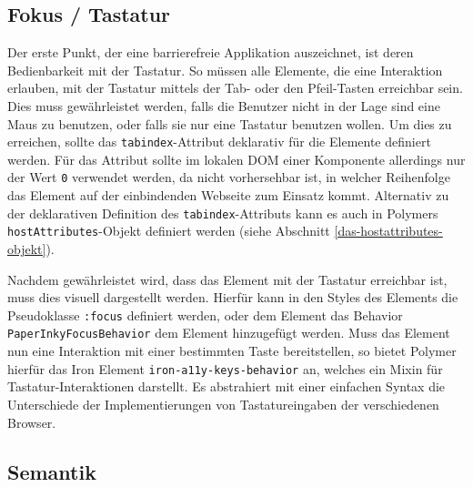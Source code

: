 \subsection{Fokus / Tastatur}\label{fokus-tastatur}

Der erste Punkt, der eine barrierefreie Applikation auszeichnet, ist deren Bedienbarkeit mit der Tastatur. So müssen alle Elemente, die eine Interaktion erlauben, mit der Tastatur mittels der Tab- oder den Pfeil-Tasten erreichbar sein. Dies muss gewährleistet werden, falls die Benutzer nicht in der Lage sind eine Maus zu benutzen, oder falls sie nur eine Tastatur benutzen wollen. Um dies zu erreichen, sollte das \texttt{tabindex}-Attribut deklarativ für die Elemente definiert werden. Für das Attribut sollte im lokalen \ac{DOM} einer Komponente allerdings nur der Wert \texttt{0} verwendet werden, da nicht vorhersehbar ist, in welcher Reihenfolge das Element auf der einbindenden Webseite zum Einsatz kommt. Alternativ zu der deklarativen Definition des \texttt{tabindex}-Attributs kann es auch in Polymers \texttt{hostAttributes}-Objekt definiert werden (siehe Abschnitt \ref{das-hostattributes-objekt}).

Nachdem gewährleistet wird, dass das Element mit der Tastatur erreichbar ist, muss dies visuell dargestellt werden. Hierfür kann in den Styles des Elements die Pseudoklasse \texttt{:focus} definiert werden, oder dem Element das Behavior \texttt{PaperInkyFocusBehavior} dem Element hinzugefügt werden. Muss das Element nun eine Interaktion mit einer bestimmten Taste bereitstellen, so bietet Polymer hierfür das Iron Element \texttt{iron-a11y-keys-behavior} an, welches ein Mixin für Tastatur-Interaktionen darstellt. Es abstrahiert mit einer einfachen Syntax die Unterschiede der Implementierungen von Tastatureingaben der verschiedenen Browser.


\subsection{Semantik}\label{semantik}

